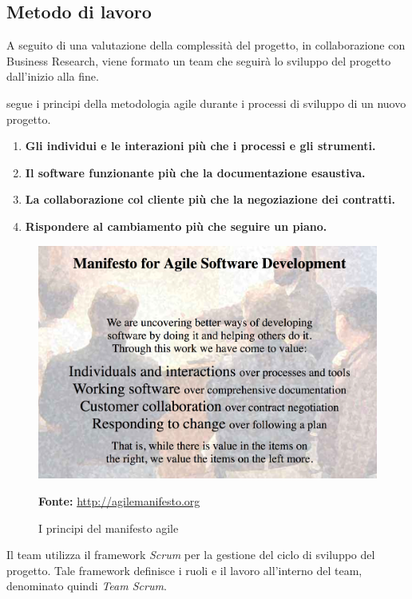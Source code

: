 \subsection{Metodo di lavoro}
A seguito di una valutazione della complessità del progetto, in collaborazione con Business Research, viene formato un team che seguirà lo sviluppo del progetto dall'inizio alla fine.

\noindent \lab{} segue i principi della metodologia agile durante i processi di sviluppo di un nuovo progetto.
\begin{enumerate}
\item \textbf{Gli individui e le interazioni più che i processi e gli strumenti.}
\item \textbf{Il software funzionante più che la documentazione esaustiva.}
\item \textbf{La collaborazione col cliente più che la negoziazione dei contratti.}
\item \textbf{Rispondere al cambiamento più che seguire un piano.}
\end{enumerate}

\begin{figure}[H]
	\begin{center}
	\includegraphics[scale=0.25]{immagini/agile_manifesto.png}
	\caption{I principi del manifesto agile}
	\small{\textbf{Fonte:} \url{http://agilemanifesto.org}}
	\end{center}
\end{figure}

\noindent Il team utilizza il framework \textit{Scrum} per la gestione del ciclo di sviluppo del progetto.
Tale framework definisce i ruoli e il lavoro all'interno del team, denominato quindi \textit{Team Scrum}.\\


